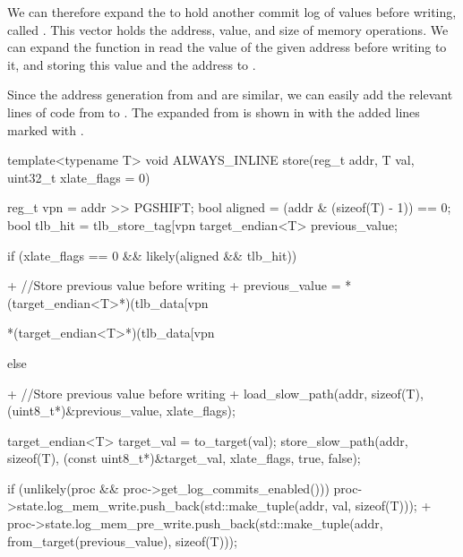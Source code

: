 We can therefore expand the  to hold another commit log of values before writing, called . This vector holds the address, value, and size of memory operations. We can expand the  function in  read the value of the given address before writing to it, and storing this value and the address to .


Since the address generation from  and  are similar, we can easily add the relevant lines of code from  to . The expanded  from  is shown in  with the added lines marked with \ccode{+}.


\begin{clisting}[caption={Modified \ccode{store()} function from \file{mmu.h} with new lines marked with \ccode{+}.}, label={lst:store}]
  template<typename T>
  void ALWAYS_INLINE store(reg_t addr, T val, uint32_t xlate_flags = 0) {
    reg_t vpn = addr >> PGSHIFT;
    bool aligned = (addr & (sizeof(T) - 1)) == 0;
    bool tlb_hit = tlb_store_tag[vpn %
    target_endian<T> previous_value;


    if (xlate_flags == 0 && likely(aligned && tlb_hit)) {
+     //Store previous value before writing
+     previous_value = *(target_endian<T>*)(tlb_data[vpn %

      *(target_endian<T>*)(tlb_data[vpn %
    } else {
+     //Store previous value before writing
+     load_slow_path(addr, sizeof(T), (uint8_t*)&previous_value, xlate_flags);

      target_endian<T> target_val = to_target(val);
      store_slow_path(addr, sizeof(T), (const uint8_t*)&target_val, xlate_flags, true, false);
    }

    if (unlikely(proc && proc->get_log_commits_enabled())) {
      proc->state.log_mem_write.push_back(std::make_tuple(addr, val, sizeof(T)));
+     proc->state.log_mem_pre_write.push_back(std::make_tuple(addr, from_target(previous_value), sizeof(T)));
    }
  }
\end{clisting}

